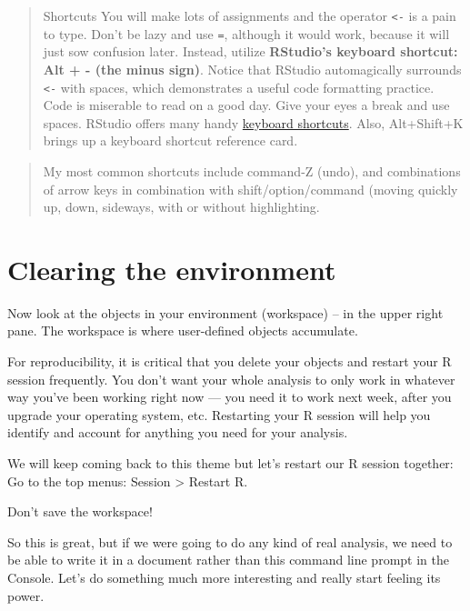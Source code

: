 \documentclass[]{book}
\begin{document}
\begin{quote}
Shortcuts
You will make lots of assignments and the operator \texttt{\textless{}-} is a pain to type. Don't be lazy and use \texttt{=}, although it would work, because it will just sow confusion later. Instead, utilize \textbf{RStudio's keyboard shortcut: Alt + - (the minus sign)}.
Notice that RStudio automagically surrounds \texttt{\textless{}-} with spaces, which demonstrates a useful code formatting practice. Code is miserable to read on a good day. Give your eyes a break and use spaces.
RStudio offers many handy \href{https://support.rstudio.com/hc/en-us/articles/200711853-Keyboard-Shortcuts}{keyboard shortcuts}. Also, Alt+Shift+K brings up a keyboard shortcut reference card.
\end{quote}

\begin{quote}
My most common shortcuts include command-Z (undo), and combinations of arrow keys in combination with shift/option/command (moving quickly up, down, sideways, with or without highlighting.
\end{quote}

\hypertarget{clearing-the-environment}{%
\section{Clearing the environment}\label{clearing-the-environment}}

Now look at the objects in your environment (workspace) -- in the upper right pane. The workspace is where user-defined objects accumulate.

For reproducibility, it is critical that you delete your objects and restart your R session frequently. You don't want your whole analysis to only work in whatever way you've been working right now --- you need it to work next week, after you upgrade your operating system, etc. Restarting your R session will help you identify and account for anything you need for your analysis.

We will keep coming back to this theme but let's restart our R session together: Go to the top menus: Session \textgreater{} Restart R.

Don't save the workspace!

So this is great, but if we were going to do any kind of real analysis, we need to be able to write it in a document rather than this command line prompt in the Console. Let's do something much more interesting and really start feeling its power.
\end{document}
